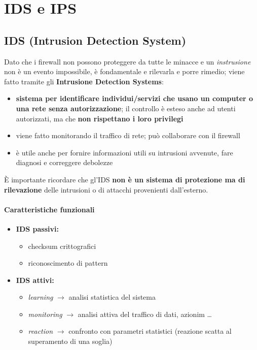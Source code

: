 \chapter{IDS e IPS}

\section{IDS (Intrusion Detection System)}

Dato che i firewall non possono proteggere da tutte le minacce e un \textit{instrusione}
non è un evento impossibile, è fondamentale e rilevarla e porre rimedio; viene 
fatto tramite gli \textbf{Intrusione Detection Systems}:
\begin{itemize}
    \item \textbf{sistema per identificare individui/servizi che usano un computer o una 
    rete senza autorizzazione}; il controllo è esteso anche ad utenti autorizzati, ma 
    che \textbf{non rispettano i loro privilegi}
    \item viene fatto monitorando il traffico di rete; può collaborare con il firewall
    \item è utile anche per fornire informazioni utili su intrusioni avvenute, fare diagnosi e correggere debolezze
\end{itemize} 

\noindent È importante ricordare che gl'IDS \textbf{non è un sistema di protezione 
ma di rilevazione} delle intrusioni o di attacchi provenienti dall'esterno.

\subsubsection{Caratteristiche funzionali}
\begin{itemize}
    \item \textbf{IDS passivi:}
    \begin{itemize}
        \item checksum crittografici 
        \item riconoscimento di pattern 
    \end{itemize}
    \item \textbf{IDS attivi:}
    \begin{itemize}
        \item \textit{learning} $\rightarrow$ analisi statistica del sistema 
        \item \textit{monitoring} $\rightarrow$ analisi attiva del traffico di dati, azionim \dots
        \item \textit{reaction} $\rightarrow$ confronto con parametri statistici (reazione scatta al superamento di una soglia)
    \end{itemize}
\end{itemize}

